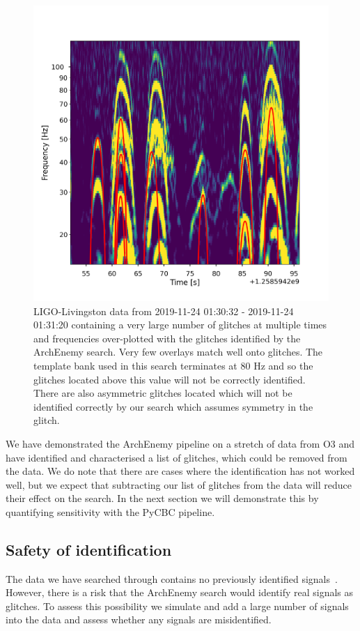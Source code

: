 \begin{figure}
       \centering
    \includegraphics[width=0.7\linewidth]{images/4_archenemy/Section3/3.7/overlay_bad_overlays.pdf}
    \caption{LIGO-Livingston data from 2019-11-24 01:30:32 - 2019-11-24 01:31:20 containing a very large number of \scl{} glitches at multiple times and frequencies over-plotted with the \scl{} glitches identified by the ArchEnemy search. Very few overlays match well onto \scl{} glitches. The template bank used in this search terminates at $80$ Hz and so the \scl{} glitches located above this value will not be correctly identified. There are also asymmetric \scl{} glitches located which will not be identified correctly by our search which assumes symmetry in the \scl{} glitch.}
    \label{4:fig:overlay_bads}
\end{figure}

We have demonstrated the ArchEnemy pipeline on a stretch of data from O3 and have identified and characterised a list of \scl{} glitches, which could be removed from the data. We do note that there are cases where the identification has not worked well, but we expect that subtracting our list of glitches from the data will reduce their effect on the \gw{} search. In the next section we will demonstrate this by quantifying sensitivity with the PyCBC pipeline.

\subsection{Safety of \scl{} identification}
\label{4:ssec:injsafety}

The data we have searched through contains no previously identified \gw{} signals~\cite{gwtc3:2023}. However, there is a risk that the ArchEnemy search would identify real \gw{} signals as \scl{} glitches. To assess this possibility we simulate and add a large number of \gw{} signals into the data and assess whether any signals are misidentified.

